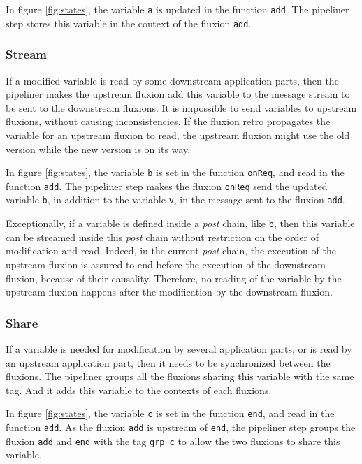 In figure \ref{fig:states}, the variable \texttt{a} is updated in the function \texttt{add}.
The pipeliner step stores this variable in the context of the fluxion \texttt{add}.

\subsubsection{Stream}
If a modified variable is read by some downstream application parts, then the pipeliner makes the upstream fluxion add this variable to the message stream to be sent to the downstream fluxions.
It is impossible to send variables to upstream flux\-ions, without causing inconsistencies.
If the fluxion retro propagates the variable for an upstream fluxion to read, the upstream fluxion might use the old version while the new version is on its way.

In figure \ref{fig:states}, the variable \texttt{b} is set in the function \texttt{onReq}, and read in the function \texttt{add}.
The pipeliner step makes the fluxion \texttt{onReq} send the updated variable \texttt{b}, in addition to the variable \texttt{v}, in the message sent to the fluxion \texttt{add}.

Exceptionally, if a variable is defined inside a \textit{post} chain, like \texttt{b}, then this variable can be streamed inside this \textit{post} chain without restriction on the order of modification and read.
Indeed, in the current \textit{post} chain, the execution of the upstream fluxion is assured to end before the execution of the downstream fluxion, because of their causality.
Therefore, no reading of the variable by the upstream fluxion happens after the modification by the downstream fluxion.

\subsubsection{Share}
If a variable is needed for modification by several application parts, or is read by an upstream application part, then it needs to be synchronized between the fluxions.
The pipeliner groups all the fluxions sharing this variable with the same tag.
And it adds this variable to the contexts of each fluxions.

In figure \ref{fig:states}, the variable \texttt{c} is set in the function \texttt{end}, and read in the function \texttt{add}.
As the fluxion \texttt{add} is upstream of \texttt{end}, the pipeliner step groups the fluxion \texttt{add} and \texttt{end} with the tag \texttt{grp\_c} to allow the two fluxions to share this variable.